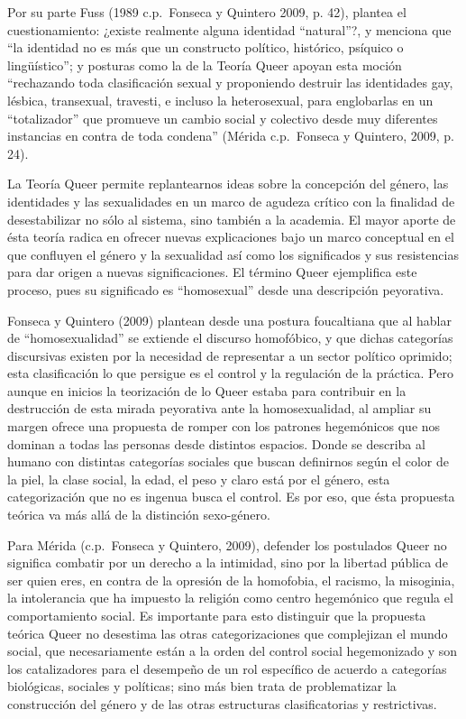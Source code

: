 Por su parte Fuss (1989 c.p.~Fonseca y Quintero 2009, p. 42), plantea el
cuestionamiento: ¿existe realmente alguna identidad “natural”?, y menciona que
“la identidad no es más que un constructo político, histórico, psíquico o
lingüístico”;
y posturas como la de la Teoría Queer apoyan esta moción “rechazando toda
clasificación sexual y proponiendo destruir las identidades gay, lésbica,
transexual, travesti, e incluso la heterosexual, para englobarlas en un
“totalizador” que promueve un cambio social y colectivo desde muy diferentes
instancias en contra de toda condena” (Mérida c.p.~Fonseca y Quintero, 2009,
p. 24).

La Teoría Queer permite replantearnos ideas sobre la concepción del género, las
identidades y las sexualidades en un marco de agudeza crítico con la finalidad
de desestabilizar no sólo al sistema, sino también a la academia.
El mayor aporte de ésta teoría radica en ofrecer nuevas explicaciones bajo un
marco conceptual en el que confluyen el género y la sexualidad así como los
significados y sus resistencias para dar origen a nuevas significaciones.
El término Queer ejemplifica este proceso, pues su significado es “homosexual”
desde una descripción peyorativa.

Fonseca y Quintero (2009) plantean desde una postura foucaltiana que al hablar
de “homosexualidad” se extiende el discurso homofóbico, y que dichas categorías
discursivas existen por la necesidad de representar a un sector político
oprimido;
esta clasificación lo que persigue es el control y la regulación de la práctica.
Pero aunque en inicios la teorización de lo Queer estaba para contribuir en la
destrucción de esta mirada peyorativa ante la homosexualidad, al ampliar su
margen ofrece una propuesta de romper con los patrones hegemónicos que nos
dominan a todas las personas desde distintos espacios.
Donde se describa al humano con distintas categorías sociales que buscan
definirnos según el color de la piel, la clase social, la edad, el peso y
claro está por el género, esta categorización que no es ingenua busca el
control.
Es por eso, que ésta propuesta teórica va más allá de la distinción sexo-género.

Para Mérida (c.p.~Fonseca y Quintero, 2009), defender los postulados Queer no
significa combatir por un derecho a la intimidad, sino por la libertad pública
de ser quien eres, en contra de la opresión de la homofobia, el racismo, la
misoginia, la intolerancia que ha impuesto la religión como centro hegemónico
que regula el comportamiento social.
Es importante para esto distinguir que la propuesta teórica Queer no desestima
las otras categorizaciones que complejizan el mundo social, que necesariamente
están a la orden del control social hegemonizado y son los catalizadores para el
desempeño de un rol específico de acuerdo a categorías biológicas, sociales y
políticas;
sino más bien trata de problematizar la construcción del género y de
las otras estructuras clasificatorias y restrictivas.

